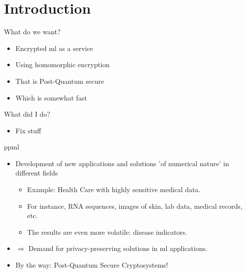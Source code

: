 \section{Introduction}
\begin{frame}{What do we want?}
  \begin{itemize}
    \item Encrypted \gls{ml} as a service
    \item Using homomorphic encryption
    \item That is Post-Quantum secure
    \item Which is somewhat fast
  \end{itemize}
\end{frame}

\begin{frame}{What did I do?}
  \begin{itemize}
    \item Fix stuff
  \end{itemize}
\end{frame}

\begin{frame}{\gls{ppml}}
  \begin{itemize}
    \item Development of new applications and solutions 'of numerical nature' in different fields
          \begin{itemize}
            \item Example: Health Care with highly sensitive medical data.
            \item For instance, RNA sequences, images of skin, lab data, medical records, etc.
            \item The results are even more volatile: disease indicators.
          \end{itemize}
    \item $\Rightarrow$ Demand for privacy-preserving solutions in \gls{ml} applications.
    \item By the way: Post-Quantum Secure Cryptosystems!
  \end{itemize}
\end{frame}

